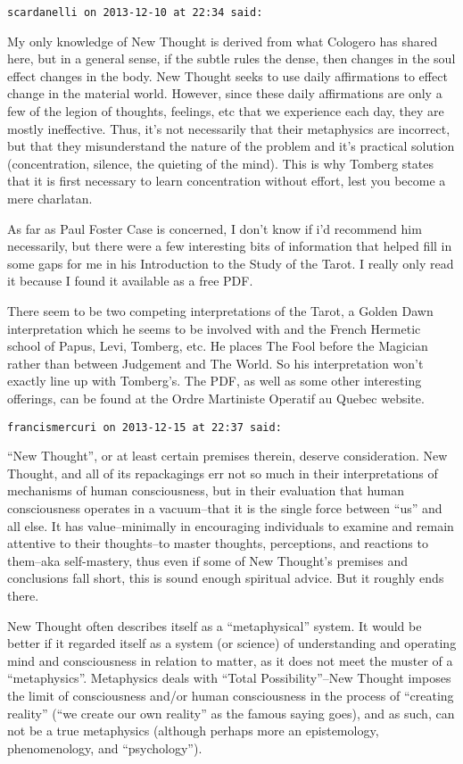 \begin{footnotesize}
\begin{sffamily}
\hfill

\texttt{scardanelli on 2013-12-10 at 22:34 said: }

My only knowledge of New Thought is derived from what Cologero has shared here, but in a general sense, if the subtle rules the dense, then changes in the soul effect changes in the body. New Thought seeks to use daily affirmations to effect change in the material world. However, since these daily affirmations are only a few of the legion of thoughts, feelings, etc that we experience each day, they are mostly ineffective. Thus, it's not necessarily that their metaphysics are incorrect, but that they misunderstand the nature of the problem and it's practical solution (concentration, silence, the quieting of the mind). This is why Tomberg states that it is first necessary to learn concentration without effort, lest you become a mere charlatan. 

As far as Paul Foster Case is concerned, I don't know if i'd recommend him necessarily, but there were a few interesting bits of information that helped fill in some gaps for me in his Introduction to the Study of the Tarot. I really only read it because I found it available as a free PDF. 

There seem to be two competing interpretations of the Tarot, a Golden Dawn interpretation which he seems to be involved with and the French Hermetic school of Papus, Levi, Tomberg, etc. He places The Fool before the Magician rather than between Judgement and The World. So his interpretation won't exactly line up with Tomberg's. The PDF, as well as some other interesting offerings, can be found at the Ordre Martiniste Operatif au Quebec website.


\hfill

\texttt{francismercuri on 2013-12-15 at 22:37 said: }

“New Thought”, or at least certain premises therein, deserve consideration. New Thought, and all of its repackagings err not so much in their interpretations of mechanisms of human consciousness, but in their evaluation that human consciousness operates in a vacuum–that it is the single force between “us” and all else. It has value–minimally in encouraging individuals to examine and remain attentive to their thoughts–to master thoughts, perceptions, and reactions to them–aka self-mastery, thus even if some of New Thought's premises and conclusions fall short, this is sound enough spiritual advice. But it roughly ends there.

New Thought often describes itself as a “metaphysical” system. It would be better if it regarded itself as a system (or science) of understanding and operating mind and consciousness in relation to matter, as it does not meet the muster of a “metaphysics”. Metaphysics deals with “Total Possibility”–New Thought imposes the limit of consciousness and/or human consciousness in the process of “creating reality” (“we create our own reality” as the famous saying goes), and as such, can not be a true metaphysics (although perhaps more an epistemology, phenomenology, and “psychology”). 


\end{sffamily}
\end{footnotesize}
